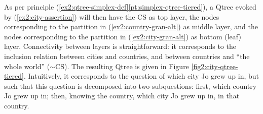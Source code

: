 \begin{exe}
	\label{ex2:country-gran-alt}
\end{exe} 

As per principle (\ref{ex2:qtree-simplex-def}\ref{pt:simplex-qtree-tiered}), a Qtree evoked by (\ref{ex2:city-assertion}) will then have the CS as top layer, the nodes corresponding to the partition in (\ref{ex2:country-gran-alt}) as middle layer, and the nodes corresponding to the partition in (\ref{ex2:city-gran-alt}) as bottom (leaf) layer. Connectivity between layers is straightforward: it corresponds to the inclusion relation between cities and countries, and between countries and ``the whole world'' ($\sim$CS). The resulting Qtree is given in Figure \ref{fig2:city-qtree-tiered}. Intuitively, it corresponds to the question of which city Jo grew up in, but such that this question is decomposed into two subquestions: first, which country Jo grew up in; then, knowing the country, which city Jo grew up in, in that country.


